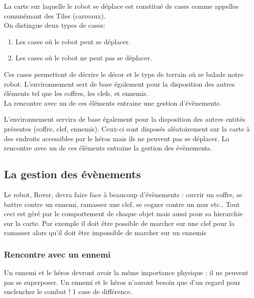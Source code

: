 \documentclass[a4paper 12pts]{article}
\begin{document}
\vspace{0.75cm}

La carte sur laquelle le robot se déplace est constitué de cases comme appelles comunémant des Tiles (carreaux). \\
On distingue deux types de cases:

\begin{enumerate}
	\item Les cases où le robot peut se déplacer.
	\item Les cases où le robot ne peut pas se déplacer.
\end{enumerate}

Ces cases permettent de décrire le décor et le type de terrain où se balade notre robot.
L'environnement sert de base également pour la disposition des autres éléments tel que les coffres, les clefs, et ennemis.\\
La rencontre avec un de ces éléments entraine une gestion d'évênements.

L'environnement servira de base également pour la disposition des autres entités présentes (coffre, clef, ennemis).
Ceux-ci sont disposés aléatoirement sur la carte à des endroits accessibles par le héros mais ils ne peuvent pas se déplacer.
La rencontre avec un de ces éléments entraine la gestion des évènements.



\newpage
\subsection{La gestion des évènements}

Le robot, Rover, devra faire face à beaucoup d'évènements : ouvrir un coffre, se battre contre un ennemi, ramasser une clef, se cogner contre un mur etc..
Tout ceci est géré par le comportement de chaque objet mais aussi pour sa hierarchie sur la carte.
Par exemple il doit être possible de marcher sur une clef pour la ramasser alors qu'il doit être impossible de marcher sur un ennemis

\subsubsection {Rencontre avec un ennemi} 
Un ennemi et le héros devront avoir la même importance physique : il ne peuvent pas se superposer.
Un ennemi et le héros n'auront besoin que d'un regard pour enclencher le combat ! 1 case de différence.
\end{document}
